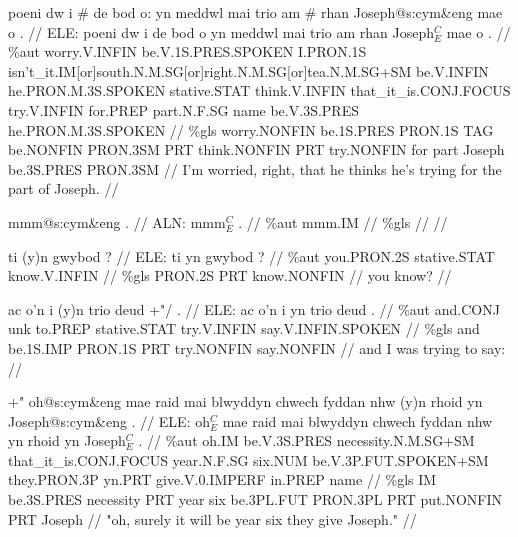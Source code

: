 \documentclass[a4paper,10pt]{article}
\begin{document}
\ex
\begingl[lingstyle=gergl]
\glchat poeni dw i \# de bod o: yn meddwl mai trio am \# rhan Joseph@s:cym\&eng mae o . //
\glsurface ELE:  poeni dw i de bod o yn meddwl mai trio am rhan Joseph$^{C}_{E}$ mae o .  //
\glauto \%aut  worry{\scriptsize .V.INFIN} be{\scriptsize .V.1S.PRES.SPOKEN} I{\scriptsize .PRON.1S} isn't\_it{\scriptsize .IM[or]south.N.M.SG[or]right.N.M.SG[or]tea.N.M.SG+SM} be{\scriptsize .V.INFIN} he{\scriptsize .PRON.M.3S.SPOKEN} stative{\scriptsize .STAT} think{\scriptsize .V.INFIN} that\_it\_is{\scriptsize .CONJ.FOCUS} try{\scriptsize .V.INFIN} for{\scriptsize .PREP} part{\scriptsize .N.F.SG} name be{\scriptsize .V.3S.PRES} he{\scriptsize .PRON.M.3S.SPOKEN}   //
\glmanual \%gls  worry{\scriptsize .NONFIN} be{\scriptsize .1S.PRES} PRON{\scriptsize .1S} TAG be{\scriptsize .NONFIN} PRON{\scriptsize .3SM} PRT think{\scriptsize .NONFIN} PRT try{\scriptsize .NONFIN} for part Joseph be{\scriptsize .3S.PRES} PRON{\scriptsize .3SM}   //
\gleng I'm worried, right, that he thinks he's trying for the part of Joseph. //
\endgl
\xe

\ex
\begingl[lingstyle=gergl]
\glchat mmm@s:cym\&eng . //
\glsurface ALN:  mmm$^{C}_{E}$ .  //
\glauto \%aut  mmm{\scriptsize .IM}   //
\glmanual \%gls     //
\gleng  //
\endgl
\xe

\ex
\begingl[lingstyle=gergl]
\glchat ti (y)n gwybod ? //
\glsurface ELE:  ti yn gwybod ?  //
\glauto \%aut  you{\scriptsize .PRON.2S} stative{\scriptsize .STAT} know{\scriptsize .V.INFIN}   //
\glmanual \%gls  PRON{\scriptsize .2S} PRT know{\scriptsize .NONFIN}   //
\gleng you know? //
\endgl
\xe

\ex
\begingl[lingstyle=gergl]
\glchat ac o'n i (y)n trio deud +"/ . //
\glsurface ELE:  ac o'n i yn trio deud .  //
\glauto \%aut  and{\scriptsize .CONJ} unk to{\scriptsize .PREP} stative{\scriptsize .STAT} try{\scriptsize .V.INFIN} say{\scriptsize .V.INFIN.SPOKEN}   //
\glmanual \%gls  and be{\scriptsize .1S.IMP} PRON{\scriptsize .1S} PRT try{\scriptsize .NONFIN} say{\scriptsize .NONFIN}   //
\gleng and I was trying to say: //
\endgl
\xe

\ex
\begingl[lingstyle=gergl]
\glchat +" oh@s:cym\&eng mae raid mai blwyddyn chwech fyddan nhw (y)n rhoid yn Joseph@s:cym\&eng . //
\glsurface ELE:  oh$^{C}_{E}$ mae raid mai blwyddyn chwech fyddan nhw yn rhoid yn Joseph$^{C}_{E}$ .  //
\glauto \%aut  oh{\scriptsize .IM} be{\scriptsize .V.3S.PRES} necessity{\scriptsize .N.M.SG+SM} that\_it\_is{\scriptsize .CONJ.FOCUS} year{\scriptsize .N.F.SG} six{\scriptsize .NUM} be{\scriptsize .V.3P.FUT.SPOKEN+SM} they{\scriptsize .PRON.3P} yn{\scriptsize .PRT} give{\scriptsize .V.0.IMPERF} in{\scriptsize .PREP} name   //
\glmanual \%gls  IM be{\scriptsize .3S.PRES} necessity PRT year six be{\scriptsize .3PL.FUT} PRON{\scriptsize .3PL} PRT put{\scriptsize .NONFIN} PRT Joseph   //
\gleng "oh, surely it will be year six they give Joseph." //
\endgl
\xe
\end{document}
